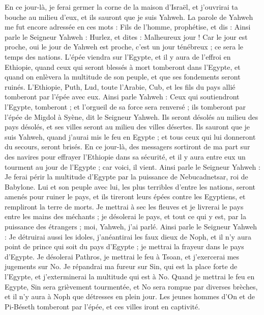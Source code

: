 \begin{multicols}{2}
En ce jour-là, je ferai germer la corne de la maison d'Israël, et j'ouvrirai ta bouche au milieu d'eux, et ils sauront que je suis Yahweh.
\VerseOne{}La parole de Yahweh me fut encore adressée en ces mots :
Fils de l’homme, prophétise, et dis : Ainsi parle le Seigneur Yahweh : Hurlez, et dites : Malheureux jour !
Car le jour est proche, oui le jour de Yahweh est proche, c'est un jour ténébreux ; ce sera le temps des nations.
L'épée viendra sur l'Egypte, et il y aura de l'effroi en Ethiopie, quand ceux qui seront blessés à mort tomberont dans l'Egypte, et quand on enlèvera la multitude de son peuple, et que ses fondements seront ruinés.
L’Ethiopie, Puth, Lud, toute l’Arabie, Cub, et les fils du pays allié tomberont par l'épée avec eux\FTNT{}.
Ainsi parle Yahweh : Ceux qui soutiendront l'Egypte, tomberont ; et l'orgueil de sa force sera renversé ; ils tomberont par l'épée de Migdol à Syène, dit le Seigneur Yahweh.
Ils seront désolés au milieu des pays désolés, et ses villes seront au milieu des villes désertes.
Ils sauront que je suis Yahweh, quand j'aurai mis le feu en Egypte ; et tous ceux qui lui donneront du secours, seront brisés.
En ce jour-là, des messagers sortiront de ma part sur des navires pour effrayer l’Ethiopie dans sa sécurité, et il y aura entre eux un tourment au jour de l’Egypte ; car voici, il vient.
Ainsi parle le Seigneur Yahweh : Je ferai périr la multitude d'Egypte par la puissance de Nebucadnetsar, roi de Babylone.
Lui et son peuple avec lui, les plus terribles d'entre les nations, seront amenés pour ruiner le pays, et ils tireront leurs épées contre les Egyptiens, et rempliront la terre de morts.
Je mettrai à sec les fleuves et je livrerai le pays entre les mains des méchants ; je désolerai le pays, et tout ce qui y est, par la puissance des étrangers ; moi, Yahweh, j'ai parlé.
Ainsi parle le Seigneur Yahweh : Je détruirai aussi les idoles, j'anéantirai les faux dieux de Noph, et il n'y aura point de prince qui soit du pays d'Egypte ; je mettrai la frayeur dans le pays d'Egypte\FTNT{}.
Je désolerai Pathros, je mettrai le feu à Tsoan, et j'exercerai mes jugements sur No\FTNT{}.
Je répandrai ma fureur sur Sin, qui est la place forte de l'Egypte, et j'exterminerai la multitude qui est à No.
Quand je mettrai le feu en Egypte, Sin sera grièvement tourmentée, et No sera rompue par diverses brèches, et il n'y aura à Noph que détresses en plein jour.
Les jeunes hommes d’On et de Pi-Béseth tomberont par l'épée, et ces villes iront en captivité.

\end{multicols}
